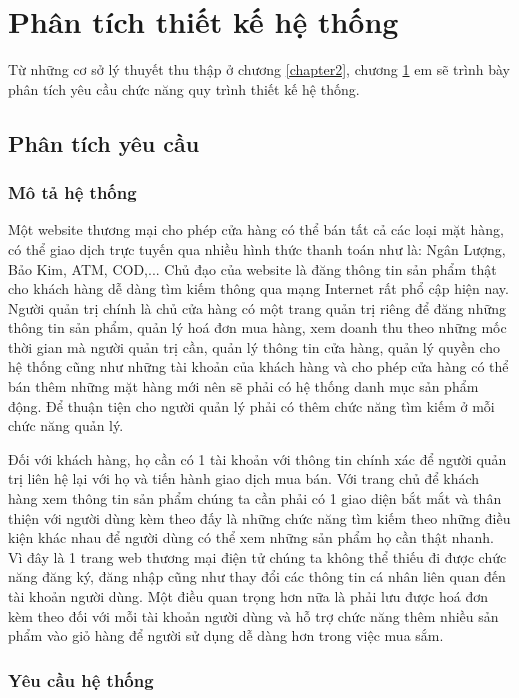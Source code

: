 \chapter{Phân tích thiết kế hệ thống}
\label{chapter3}
Từ những cơ sở lý thuyết thu thập ở chương \ref{chapter2}, chương \ref{chapter3} em sẽ trình bày phân tích yêu cầu chức năng quy trình thiết kế hệ thống.
\section{Phân tích yêu cầu}
\subsection{Mô tả hệ thống}
Một website thương mại cho phép cửa hàng có thể bán tất cả các loại mặt hàng, có thể giao dịch trực tuyến qua nhiều hình thức thanh toán như là: Ngân Lượng, Bảo Kim, ATM, COD,...
Chủ đạo của website là đăng thông tin sản phẩm thật cho khách hàng dễ dàng tìm kiếm thông qua mạng Internet rất phổ cập hiện nay. Người quản trị chính là chủ cửa hàng có một trang quản trị riêng để đăng những thông tin sản phẩm, quản lý hoá đơn mua hàng, xem doanh thu theo những mốc thời gian mà người quản trị cần, quản lý thông tin cửa hàng, quản lý quyền cho hệ thống cũng như những tài khoản của khách hàng và cho phép cửa hàng có thể bán thêm những mặt hàng mới nên sẽ phải có hệ thống danh mục sản phẩm động. Để thuận tiện cho người quản lý phải có thêm chức năng tìm kiếm ở mỗi chức năng quản lý.
\par
Đối với khách hàng, họ cần có 1 tài khoản với thông tin chính xác để người quản trị liên hệ lại với họ và tiến hành giao dịch mua bán. Với trang chủ để khách hàng xem thông tin sản phẩm chúng ta cần phải có 1 giao diện bắt mắt và thân thiện với người dùng kèm theo đấy là những chức năng tìm kiếm theo những điều kiện khác nhau để người dùng có thể xem những sản phẩm họ cần thật nhanh. Vì đây là 1 trang web thương mại điện tử chúng ta không thể thiếu đi được chức năng đăng ký, đăng nhập cũng như thay đổi các thông tin cá nhân liên quan đến tài khoản người dùng. Một điều quan trọng hơn nữa là phải lưu được hoá đơn kèm theo đối với mỗi tài khoản người dùng và hỗ trợ chức năng thêm nhiều sản phẩm vào giỏ hàng để người sử dụng dễ dàng hơn trong việc mua sắm.
\subsection{Yêu cầu hệ thống}
